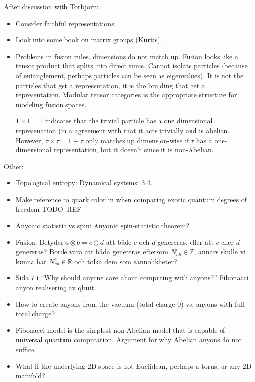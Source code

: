 \documentclass[a4paper,10pt,oneside]{book}
\theoremstyle{plain}
\theoremstyle{definition}
\theoremstyle{remark}
\begin{document}
{After discussion with Torbjörn:

\begin{itemize}
  \item Consider faithful representations.
  \item Look into some book on matrix groups (Kurtis).
  \item Problems in fusion rules, dimensions do not match up. Fusion looks like a tensor product that splits into direct sums. Cannot isolate particles (because of entanglement, perhaps particles can be seen as eigenvalues). It is not the particles that get a representation, it is the braiding that get a representation. Modular tensor categories is the appropriate structure for modeling fusion spaces.

  $1 \times 1 = 1$ indicates that the trivial particle has a one dimensional represenation (in a agreement with that it acts trivially and is abelian. However, $\tau \times \tau = 1 + \tau$ only matches up dimension-wise if $\tau$ has a one-dimensional representation, but it doesn't since it is non-Abelian.
\end{itemize}


Other:

\begin{itemize}
  \item Topological entropy: Dynamical systems: 3.4.
  \item Make reference to quark color in when comparing exotic quantum degrees of freedom TODO: REF
  \item Anyonic statistic vs spin: Anyonic spin-statistic theorem?
  \item Fusion: Betyder $a\otimes b = c \oplus d$ att både $c$ och $d$ genereras, eller att $c$ eller $d$ genereras? Borde vara att båda genereras eftersom $N_{ab}^c \in \mathbb{Z}$, annars skulle vi kunna har $N_{ab}^c \in \mathbb{R}$ och tolka dem som sannolikheter?
  \item Sida 7 i ``Why should anyone care about computing with anyons?'' Fibonacci anyon realisering av qbuit.
  \item How to create anyons from the vacuum (total charge 0) vs. anyons with full total charge?
  \item Fibonacci model is the simplest non-Abelian model that is capable of universal quantum computation. Argument for why Abelian anyons do not suffice.
  \item What if the underlying 2D space is not Euclidean, perhaps a torus, or any 2D manifold?
\end{itemize}




}
\end{document}
